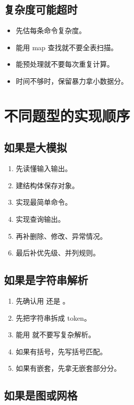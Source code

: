 \subsection{复杂度可能超时}

\begin{itemize}
  \item 先估每条命令复杂度。
  \item 能用 map 查找就不要全表扫描。
  \item 能预处理就不要每次重复计算。
  \item 时间不够时，保留暴力拿小数据分。
\end{itemize}

\section{不同题型的实现顺序}\label{sec:07-39}

\subsection{如果是大模拟}

\begin{enumerate}
  \item 先读懂输入输出。
  \item 建结构体保存对象。
  \item 实现最简单命令。
  \item 实现查询输出。
  \item 再补删除、修改、异常情况。
  \item 最后补优先级、并列规则。
\end{enumerate}

\subsection{如果是字符串解析}

\begin{enumerate}
  \item 先确认用  还是 。
  \item 先把字符串拆成 token。
  \item 能用  就不要写复杂解析。
  \item 如果有括号，先写括号匹配。
  \item 如果有嵌套，先拿无嵌套部分分。
\end{enumerate}

\subsection{如果是图或网格}

